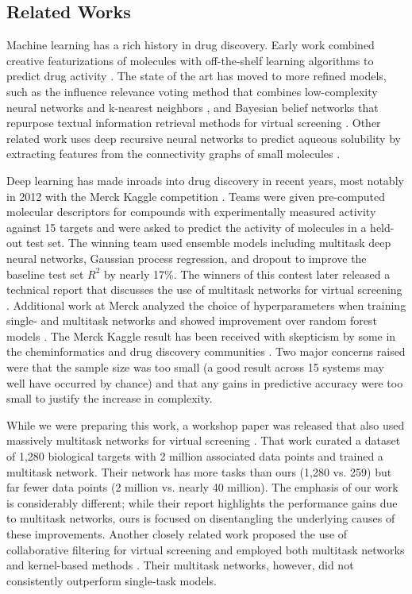 \subsection{Related Works}

Machine learning has a rich history in drug discovery. Early work combined
creative featurizations of molecules with off-the-shelf learning algorithms
to predict drug activity \cite{varnek2012machine}. The state of the art has
moved to more refined models, such as the influence relevance voting method
that combines low-complexity neural networks and k-nearest neighbors
\cite{swamidass2009influence}, and Bayesian belief networks that repurpose
textual information retrieval methods for virtual screening
\cite{abdo2010ligand}. Other related work uses deep recursive neural
networks to predict aqueous solubility by extracting features from the
connectivity graphs of small molecules \cite{lusci2013deep}.

Deep learning has made inroads into drug discovery in recent years, most
notably in 2012 with the Merck Kaggle competition \cite{dahl2012deep}.
Teams were given pre-computed molecular descriptors for compounds with
experimentally measured activity against 15 targets and were asked to
predict the activity of molecules in a held-out test set. The winning team
used ensemble models including multitask deep neural networks, Gaussian
process regression, and dropout to improve the baseline test set $R^2$ by
nearly 17\%. The winners of this contest later released a technical report
that discusses the use of multitask networks for virtual screening
\cite{dahl2014multi}. Additional work at Merck analyzed the choice of
hyperparameters when training single- and multitask networks and showed
improvement over random forest models \cite{ma2015deep}. The Merck Kaggle
result has been received with skepticism by some in the cheminformatics and
drug discovery communities \citep[and associated comments]{lowe2012did}.
Two major concerns raised were that the sample size was too small (a good
result across 15 systems may well have occurred by chance) and that any
gains in predictive accuracy were too small to justify the increase in
complexity.

While we were preparing this work, a workshop paper was released that also
used massively multitask networks for virtual screening
\cite{unterthinerdeep}. That work curated a dataset of 1,280 biological
targets with 2 million associated data points and trained a multitask
network. Their network has more tasks than ours (1,280 vs. 259) but far
fewer data points (2 million vs. nearly 40 million). The emphasis of our
work is considerably different; while their report highlights the
performance gains due to multitask networks, ours is focused on
disentangling the underlying causes of these improvements. Another closely
related work proposed the use of collaborative filtering for virtual
screening and employed both multitask networks and kernel-based methods
\cite{erhan2006collaborative}. Their multitask networks, however, did not
consistently outperform single-task models.

